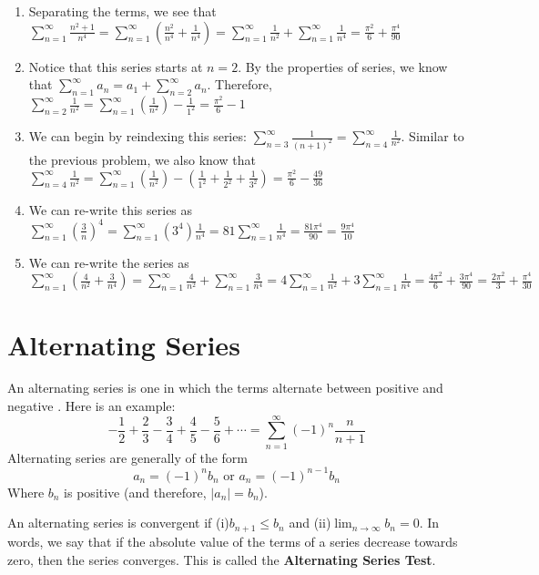 \begin{Answer}[ref = euler1]
\begin{enumerate}
\item Separating the terms, we see that $\sum_{n=1}^\infty \frac{n^2 + 1}{n^4} 
= \sum_{n=1}^\infty \left( \frac{n^2}{n^4} + \frac{1}{n^4} \right) = \sum_{n=1}
^\infty \frac{1}{n^2} + \sum_{n=1}^\infty \frac{1}{n^4} = \frac{\pi^2}{6} + 
\frac{\pi^4}{90}$
\item Notice that this series starts at $n = 2$. By the properties of series, 
we know that $\sum_{n=1}^\infty a_n = a_1 + \sum_{n=2}^\infty a_n$. Therefore, 
$\sum_{n=2}^\infty \frac{1}{n^2} = \sum_{n=1}^\infty \left( \frac{1}{n^2} 
\right) - \frac{1}{1^2} = \frac{\pi^2}{6} - 1$
\item We can begin by reindexing this series: $\sum_{n=3}^\infty \frac{1}{(n + 
1)^2} = \sum_{n=4}^\infty \frac{1}{n^2}$. Similar to the previous problem, we 
also know that $\sum_{n=4}^\infty \frac{1}{n^2} = \sum_{n=1}^\infty \left( 
\frac{1}{n^2} \right) - \left( \frac{1}{1^2} + \frac{1}{2^2} + \frac{1}{3^2} 
\right) = \frac{\pi^2}{6} - \frac{49}{36}$
\item We can re-write this series as $\sum_{n=1}^\infty \left( \frac{3}{n} 
\right)^4 = \sum_{n=1}^\infty (3^4)\frac{1}{n^4} = 81 \sum_{n=1}^\infty 
\frac{1}{n^4} = \frac{81\pi^4}{90} = \frac{9\pi^4}{10}$
\item We can re-write the series as $\sum_{n=1}^\infty \left( \frac{4}{n^2} + 
\frac{3}{n^4} \right) = \sum_{n=1}^\infty \frac{4}{n^2} + \sum_{n=1}^\infty 
\frac{3}{n^4} = 4 \sum_{n=1}^\infty \frac{1}{n^2} + 3 \sum_{n=1}^\infty 
\frac{1}{n^4} = \frac{4\pi^2}{6} + \frac{3\pi^4}{90} = \frac{2\pi^2}{3} + 
\frac{\pi^4}{30}$
\end{enumerate}
\end{Answer}

\section{Alternating Series}
An alternating series is one in which the terms alternate between positive and 
negative . Here is an example:
$$-\frac{1}{2} + \frac{2}{3} - \frac{3}{4} + \frac{4}{5} - \frac{5}{6} + 
\cdots = \sum_{n=1}^\infty (-1)^n \frac{n}{n + 1}$$
Alternating series are generally of the form
$$a_n = (-1)^n b_n \text{ or } a_n = (-1)^{n - 1} b_n$$
Where $b_n$ is positive (and therefore, $|a_n| = b_n$).

An alternating series is convergent if (i)$b_{n+1} \leq b_n$ and (ii)$\lim_{n 
\to \infty} b_n = 0$. In words, we say that if the absolute value of the terms 
of a series decrease towards zero, then the series converges. This is called 
the \textbf{Alternating Series Test}. 

